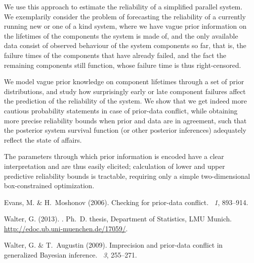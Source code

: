 \documentclass[12pt,a4paper,twocolumn,fleqn]{narmsabs}
\begin{document}
We use this approach to estimate the reliability of a simplified parallel system.
We exemplarily consider the problem of forecasting the reliability of a currently running new or one of a kind system,
where we have vague prior information on the lifetimes of the components the system is made of,
and the only available data consist of observed behaviour of the system components so far,
that is, the failure times of the components that have already failed,
and the fact the remaining components still function,
whose failure time is thus right-censored.

We model vague prior knowledge on component lifetimes through a set of prior distributions,
and study how surprisingly early or late component failures
affect the prediction of the reliability of the system.
We show that we get indeed more cautious probability statements in case of prior-data conflict,
while obtaining more precise reliability bounds when prior and data are in agreement,
such that the posterior system survival function (or other posterior inferences)
adequately reflect the state of affairs.

The parameters through which prior information is encoded have a clear interpretation
and are thus easily elicited;
calculation of lower and upper predictive reliability bounds is tractable,
requiring only a simple two-dimensional box-constrained optimization.


%
%

\begin{thebibliography}{9}
Evans, M. \& H.~Moshonov (2006).
\newblock Checking for prior-data conflict.
~{\em 1}, 893--914.

Walter, G. (2013).
.
\newblock Ph.\ D. thesis, Department of Statistics, LMU Munich.\\
\url{http://edoc.ub.uni-muenchen.de/17059/}.

Walter, G. \& T.~Augustin (2009).
\newblock Imprecision and prior-data conflict in generalized {B}ayesian
  inference.
~{\em 3}, 255--271.
\end{thebibliography}
\end{document}
